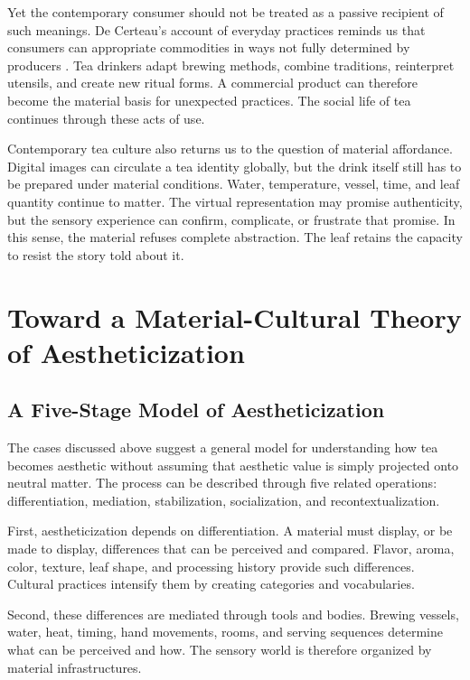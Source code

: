 \documentclass[numbers]{IntechOpen-Book}
\begin{document}
Yet the contemporary consumer should not be treated as a passive recipient of such meanings. De Certeau's account of everyday practices reminds us that consumers can appropriate commodities in ways not fully determined by producers \cite{decertau}. Tea drinkers adapt brewing methods, combine traditions, reinterpret utensils, and create new ritual forms. A commercial product can therefore become the material basis for unexpected practices. The social life of tea continues through these acts of use.

Contemporary tea culture also returns us to the question of material affordance. Digital images can circulate a tea identity globally, but the drink itself still has to be prepared under material conditions. Water, temperature, vessel, time, and leaf quantity continue to matter. The virtual representation may promise authenticity, but the sensory experience can confirm, complicate, or frustrate that promise. In this sense, the material refuses complete abstraction. The leaf retains the capacity to resist the story told about it.

\section{Toward a Material-Cultural Theory of Aestheticization}

\subsection{A Five-Stage Model of Aestheticization}

The cases discussed above suggest a general model for understanding how tea becomes aesthetic without assuming that aesthetic value is simply projected onto neutral matter. The process can be described through five related operations: differentiation, mediation, stabilization, socialization, and recontextualization.

First, aestheticization depends on differentiation. A material must display, or be made to display, differences that can be perceived and compared. Flavor, aroma, color, texture, leaf shape, and processing history provide such differences. Cultural practices intensify them by creating categories and vocabularies.

Second, these differences are mediated through tools and bodies. Brewing vessels, water, heat, timing, hand movements, rooms, and serving sequences determine what can be perceived and how. The sensory world is therefore organized by material infrastructures.
\end{document}
